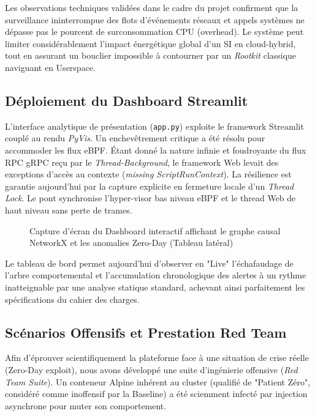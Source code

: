 \documentclass[a4paper,12pt]{article}
\begin{document}
Les observations techniques validées dans le cadre du projet confirment que la surveillance ininterrompue des flots d'événements réseaux et appels systèmes ne dépasse pas le pourcent de surconsommation CPU (overhead). Le système peut limiter considérablement l'impact énergétique global d'un SI en cloud-hybrid, tout en assurant un bouclier impossible à contourner par un \textit{Rootkit} classique naviguant en Userspace.

\subsection{Déploiement du Dashboard Streamlit}

L'interface analytique de présentation (\texttt{app.py}) exploite le framework Streamlit couplé au rendu \textit{PyVis}. Un enchevêtrement critique a été résolu pour accommoder les flux eBPF.
Étant donné la nature infinie et foudroyante du flux RPC gRPC reçu par le \textit{Thread-Background}, le framework Web levait des exceptions d'accès au contexte (\textit{missing ScriptRunContext}).
La résilience est garantie aujourd'hui par la capture explicite en fermeture locale d'un \textit{Thread Lock}. Le pont synchronise l'hyper-visor bas niveau eBPF et le thread Web de haut niveau sans perte de trames.

\begin{figure}[htbp]
\centering
\fbox{\rule{0pt}{3in} \rule{0.9\linewidth}{0pt}}
\caption{Capture d'écran du Dashboard interactif affichant le graphe causal NetworkX et les anomalies Zero-Day (Tableau latéral)}
\label{fig:dashboard}
\end{figure}

Le tableau de bord permet aujourd'hui d'observer en "Live" l'échafaudage de l'arbre comportemental et l'accumulation chronologique des alertes à un rythme inatteignable par une analyse statique standard, achevant ainsi parfaitement les spécifications du cahier des charges.

\subsection{Scénarios Offensifs et Prestation Red Team}

Afin d'éprouver scientifiquement la plateforme face à une situation de crise réelle (Zero-Day exploit), nous avons développé une suite d'ingénierie offensive (\textit{Red Team Suite}). Un conteneur Alpine inhérent au cluster (qualifié de "Patient Zéro", considéré comme inoffensif par la Baseline) a été sciemment infecté par injection asynchrone pour muter son comportement.
\end{document}
